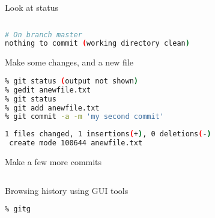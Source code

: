 \documentclass{beamer}
\begin{document}
\begin{frame}[fragile]
\begin{block}{Look at status}
\begin{lstlisting}[language=bash,basicstyle=\ttfamily\scriptsize,breaklines=true]
% git status
\end{lstlisting}
\begin{lstlisting}[language=bash,basicstyle=\sl\ttfamily\scriptsize]
# On branch master
nothing to commit (working directory clean)
\end{lstlisting}
\end{block}

\begin{block}{Make some changes, and a new file}
\begin{lstlisting}[language=bash,basicstyle=\ttfamily\scriptsize,breaklines=true]
% gedit myfile.txt
% git status (output not shown)
% gedit anewfile.txt
% git status
% git add anewfile.txt
% git commit -a -m 'my second commit'
\end{lstlisting}

\begin{lstlisting}[language=bash,basicstyle=\sl\ttfamily\scriptsize]
 1 files changed, 1 insertions(+), 0 deletions(-)
 create mode 100644 anewfile.txt
\end{lstlisting}

\end{block}



\begin{block}{Make a few more commits}
\begin{lstlisting}[language=bash,basicstyle=\ttfamily\scriptsize,breaklines=true]
% gedit / git add / git commit / ...
\end{lstlisting}
\end{block}
\end{frame}


\begin{frame}[fragile]
\begin{block}{Browsing history using GUI tools}
\begin{lstlisting}[language=bash,basicstyle=\ttfamily\scriptsize,breaklines=true]
% git log 
% gitg
\end{lstlisting}

\end{block}
\end{frame}
\end{document}
